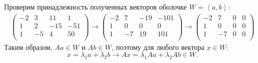 \documentclass[12pt]{article}
\begin{document}
    Проверим принадлежность полученных векторов оболочке $W = \left < a, b \right >$:
    \begin{gather*}
        \begin{pmatrix}
            -2 & 3 & 11 & 1 \\
            1 & 2 & -15 & -51 \\
            1 & -5 & 4 & 50 \\
        \end{pmatrix}
        \rightarrow
        \begin{pmatrix}
            -2 & 7 & -19 & -101 \\
            1 & 0 & 0 & 0 \\
            1 & -7 & 19 & 101 \\
        \end{pmatrix}
        \rightarrow
        \begin{pmatrix}
            -2 & 7 & 0 & 0 \\
            1 & 0 & 0 & 0 \\
            1 & -7 & 0 & 0 \\
        \end{pmatrix}
    \end{gather*}
    Таким образом, $Aa \in W$ и $Ab \in W$, поэтому для любого вектора $x \in W$:
    \[
        x = \lambda_1 a + \lambda_2 b
        \rightarrow
        A x = \lambda_1 Aa + \lambda_2 Ab \in W.
    \]
\end{document}
